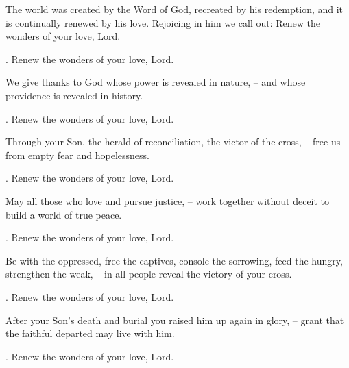 \lettrine[lines=2]{T}{}he world was created by the Word of God, recreated by his redemption, and it is continually renewed by his love. Rejoicing in him we call out: Renew the wonders of your love, Lord.
\par \Rbar. Renew the wonders of your love, Lord.

We give thanks to God whose power is revealed in nature,
– and whose providence is revealed in history.
\par \Rbar. Renew the wonders of your love, Lord.

Through your Son, the herald of reconciliation, the victor of the cross,
– free us from empty fear and hopelessness.
\par \Rbar. Renew the wonders of your love, Lord.

May all those who love and pursue justice,
– work together without deceit to build a world of true peace.
\par \Rbar. Renew the wonders of your love, Lord.

Be with the oppressed, free the captives, console the sorrowing, feed the hungry, strengthen the weak,
– in all people reveal the victory of your cross.
\par \Rbar. Renew the wonders of your love, Lord.

After your Son’s death and burial you raised him up again in glory,
– grant that the faithful departed may live with him.
\par \Rbar. Renew the wonders of your love, Lord.
